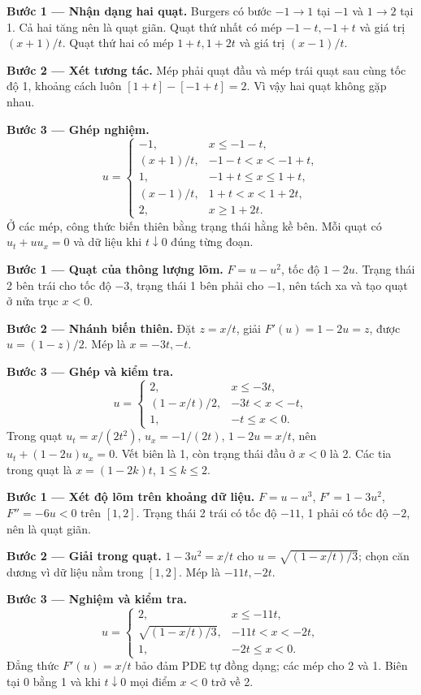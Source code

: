\textbf{Bước 1 — Nhận dạng hai quạt.} Burgers có bước $-1\to1$ tại $-1$ và $1\to2$ tại 1. Cả hai tăng nên là quạt giãn. Quạt thứ nhất có mép $-1-t,-1+t$ và giá trị $(x+1)/t$. Quạt thứ hai có mép $1+t,1+2t$ và giá trị $(x-1)/t$.

\textbf{Bước 2 — Xét tương tác.} Mép phải quạt đầu và mép trái quạt sau cùng tốc độ 1, khoảng cách luôn $[1+t]-[-1+t]=2$. Vì vậy hai quạt không gặp nhau.

\textbf{Bước 3 — Ghép nghiệm.}
\[u=\begin{cases}-1,&x\le-1-t,\\(x+1)/t,&-1-t<x<-1+t,\\1,&-1+t\le x\le1+t,\\(x-1)/t,&1+t<x<1+2t,\\2,&x\ge1+2t.\end{cases}\]
Ở các mép, công thức biến thiên bằng trạng thái hằng kề bên. Mỗi quạt có $u_t+uu_x=0$ và dữ liệu khi $t\downarrow0$ đúng từng đoạn.

\textbf{Bước 1 — Quạt của thông lượng lõm.} $F=u-u^2$, tốc độ $1-2u$. Trạng thái 2 bên trái cho tốc độ $-3$, trạng thái 1 bên phải cho $-1$, nên tách xa và tạo quạt ở nửa trục $x<0$.

\textbf{Bước 2 — Nhánh biến thiên.} Đặt $z=x/t$, giải $F'(u)=1-2u=z$, được $u=(1-z)/2$. Mép là $x=-3t,-t$.

\textbf{Bước 3 — Ghép và kiểm tra.}
\[u=\begin{cases}2,&x\le-3t,\\(1-x/t)/2,&-3t<x<-t,\\1,&-t\le x<0.\end{cases}\]
Trong quạt $u_t=x/(2t^2)$, $u_x=-1/(2t)$, $1-2u=x/t$, nên $u_t+(1-2u)u_x=0$. Vết biên là 1, còn trạng thái đầu ở $x<0$ là 2. Các tia trong quạt là $x=(1-2k)t$, $1\le k\le2$.

\textbf{Bước 1 — Xét độ lõm trên khoảng dữ liệu.} $F=u-u^3$, $F'=1-3u^2$, $F''=-6u<0$ trên $[1,2]$. Trạng thái 2 trái có tốc độ $-11$, 1 phải có tốc độ $-2$, nên là quạt giãn.

\textbf{Bước 2 — Giải trong quạt.} $1-3u^2=x/t$ cho $u=\sqrt{(1-x/t)/3}$; chọn căn dương vì dữ liệu nằm trong $[1,2]$. Mép là $-11t,-2t$.

\textbf{Bước 3 — Nghiệm và kiểm tra.}
\[u=\begin{cases}2,&x\le-11t,\\\sqrt{(1-x/t)/3},&-11t<x<-2t,\\1,&-2t\le x<0.\end{cases}\]
Đẳng thức $F'(u)=x/t$ bảo đảm PDE tự đồng dạng; các mép cho 2 và 1. Biên tại 0 bằng 1 và khi $t\downarrow0$ mọi điểm $x<0$ trở về 2.

